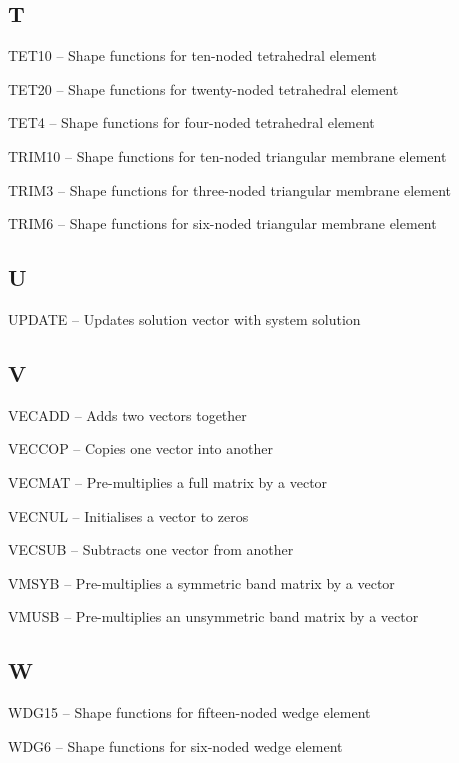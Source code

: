 \subsection*{T} %
\begin{list}{}{\leftmargin=80pt  \itemsep=0pt}
\item[TET10 \hfill]  -- Shape functions for ten-noded tetrahedral element
\item[TET20 \hfill]  -- Shape functions for twenty-noded tetrahedral element
\item[TET4 \hfill]   -- Shape functions for four-noded tetrahedral element
\item[TRIM10 \hfill] -- Shape functions for ten-noded triangular membrane element
\item[TRIM3 \hfill]  -- Shape functions for three-noded triangular membrane element
\item[TRIM6 \hfill]  -- Shape functions for six-noded triangular membrane element
\end{list}
\subsection*{U} %
\begin{list}{}{\leftmargin=80pt  \itemsep=0pt}
\item[UPDATE \hfill] -- Updates solution vector with system solution
\end{list}
\subsection*{V} %
\begin{list}{}{\leftmargin=80pt  \itemsep=0pt}
\item[VECADD \hfill] -- Adds two vectors together
\item[VECCOP \hfill] -- Copies one vector into another
\item[VECMAT \hfill] -- Pre-multiplies a full matrix by a vector
\item[VECNUL \hfill] -- Initialises a vector to zeros
\item[VECSUB \hfill] -- Subtracts one vector from another
\item[VMSYB \hfill]  -- Pre-multiplies a symmetric band matrix by a vector
\item[VMUSB \hfill]  -- Pre-multiplies an unsymmetric band matrix by a vector
\end{list}
\subsection*{W} %
\begin{list}{}{\leftmargin=80pt  \itemsep=0pt}
\item[WDG15 \hfill]  -- Shape functions for fifteen-noded wedge element
\item[WDG6 \hfill]   -- Shape functions for six-noded wedge element
\end{list}
